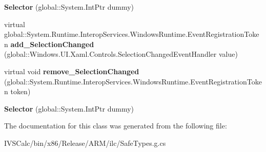\begin{DoxyCompactItemize}
\mbox{\label{class_windows_1_1_u_i_1_1_xaml_1_1_controls_1_1_primitives_1_1_selector_a4c0671da6b9b2fce8192909e4d622777}} 
{\bfseries Selector} (global\+::\+System.\+Int\+Ptr dummy)
\item 
\mbox{\label{class_windows_1_1_u_i_1_1_xaml_1_1_controls_1_1_primitives_1_1_selector_acd38c72f1d74ff86e39e3835f768b1b2}} 
virtual global\+::\+System.\+Runtime.\+Interop\+Services.\+Windows\+Runtime.\+Event\+Registration\+Token {\bfseries add\+\_\+\+Selection\+Changed} (global\+::\+Windows.\+U\+I.\+Xaml.\+Controls.\+Selection\+Changed\+Event\+Handler value)
\item 
\mbox{\label{class_windows_1_1_u_i_1_1_xaml_1_1_controls_1_1_primitives_1_1_selector_a2fc343b1044baa49806a7da0df01d46e}} 
virtual void {\bfseries remove\+\_\+\+Selection\+Changed} (global\+::\+System.\+Runtime.\+Interop\+Services.\+Windows\+Runtime.\+Event\+Registration\+Token token)
\item 
\mbox{\label{class_windows_1_1_u_i_1_1_xaml_1_1_controls_1_1_primitives_1_1_selector_a4c0671da6b9b2fce8192909e4d622777}} 
{\bfseries Selector} (global\+::\+System.\+Int\+Ptr dummy)
\end{DoxyCompactItemize}


The documentation for this class was generated from the following file\+:\begin{DoxyCompactItemize}
\item 
I\+V\+S\+Calc/bin/x86/\+Release/\+A\+R\+M/ilc/Safe\+Types.\+g.\+cs\end{DoxyCompactItemize}
